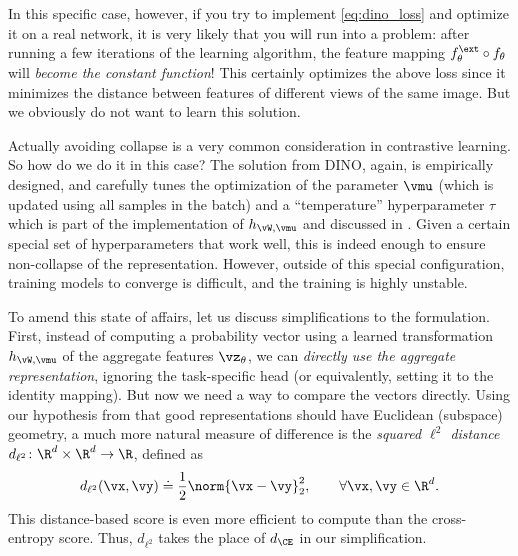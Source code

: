 \documentclass[../../book-main.tex]{subfiles}
\begin{document}
In this specific case, however, if you try to implement \eqref{eq:dino_loss} and optimize it on a real network, it is very likely that you will run into a problem: after running a few iterations of the learning algorithm, the feature mapping \(f_{\theta}^{\ext} \circ f_{\theta}\) will \textit{become the constant function}! This certainly optimizes the above loss since it minimizes the distance between features of different views of the same image. But we obviously do not want to learn this solution. 

Actually avoiding collapse is a very common consideration in contrastive learning. So how do we do it in this case? The solution from DINO, again, is empirically designed, and carefully tunes the optimization of the parameter \(\vmu\) (which is updated using all samples in the batch) and a ``temperature'' hyperparameter \(\tau\) which is part of the implementation of \(h_{\vW, \vmu}\) and discussed in . Given a certain special set of hyperparameters that work well, this is indeed enough to ensure non-collapse of the representation. However, outside of this special configuration, training models to converge is difficult, and the training is highly unstable. 

To amend this state of affairs, let us discuss simplifications to the formulation. First, instead of computing a probability vector using a learned transformation \(h_{\vW, \vmu}\) of the aggregate features \(\vz_{\theta}\), we can \textit{directly use the aggregate representation}, ignoring the task-specific head (or equivalently, setting it to the identity mapping). But now we need a way to compare the vectors directly. Using our hypothesis from  that good representations should have Euclidean (subspace) geometry, a much more natural measure of difference is the \textit{squared \(\ell^{2}\) distance} \(d_{\ell^{2}} \colon \R^{d} \times \R^{d} \to \R\), defined as 
\begin{equation}\label{eq:cosine_similarity}
    d_{\ell^{2}}(\vx, \vy) \doteq \frac{1}{2}\norm{\vx - \vy}_{2}^{2}, \qquad  \forall \vx, \vy \in \R^{d}.
\end{equation}
This distance-based score is even more efficient to compute than the cross-entropy score. Thus, \(d_{\ell^{2}}\) takes the place of \(d_{\CE}\) in our simplification. 
\end{document}
